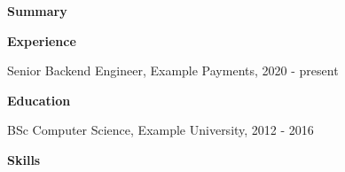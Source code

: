 \documentclass[10pt]{article}
\begin{document}
\textbf{Summary}\par \Summary\par\medskip
\textbf{Experience}\par Senior Backend Engineer, Example Payments, 2020 - present\par
\JobA\par \JobB\par\medskip
\textbf{Education}\par BSc Computer Science, Example University, 2012 - 2016\par\medskip
\textbf{Skills}\par \SkillsLine\par
\end{document}
